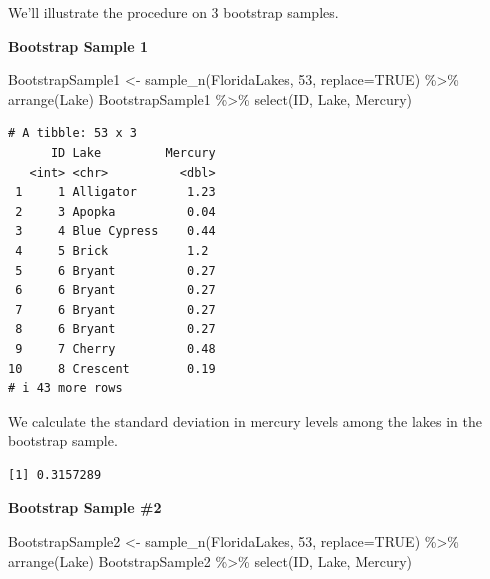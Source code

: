 \documentclass[
  letterpaper,
  DIV=11,
  numbers=noendperiod]{scrreprt}
\newenvironment{Shaded}{\begin{snugshade}}{\end{snugshade}}
\newcommand{\AttributeTok}[1]{\textcolor[rgb]{0.40,0.45,0.13}{#1}}
\newcommand{\ConstantTok}[1]{\textcolor[rgb]{0.56,0.35,0.01}{#1}}
\newcommand{\DecValTok}[1]{\textcolor[rgb]{0.68,0.00,0.00}{#1}}
\newcommand{\FunctionTok}[1]{\textcolor[rgb]{0.28,0.35,0.67}{#1}}
\newcommand{\NormalTok}[1]{\textcolor[rgb]{0.00,0.23,0.31}{#1}}
\newcommand{\OtherTok}[1]{\textcolor[rgb]{0.00,0.23,0.31}{#1}}
\newcommand{\SpecialCharTok}[1]{\textcolor[rgb]{0.37,0.37,0.37}{#1}}
\begin{document}
We'll illustrate the procedure on 3 bootstrap samples.

\textbf{Bootstrap Sample 1}

\begin{Shaded}
\begin{Highlighting}[]
\NormalTok{BootstrapSample1 }\OtherTok{\textless{}{-}} \FunctionTok{sample\_n}\NormalTok{(FloridaLakes, }\DecValTok{53}\NormalTok{, }\AttributeTok{replace=}\ConstantTok{TRUE}\NormalTok{) }\SpecialCharTok{\%\textgreater{}\%} \FunctionTok{arrange}\NormalTok{(Lake)}
\NormalTok{BootstrapSample1 }\SpecialCharTok{\%\textgreater{}\%} \FunctionTok{select}\NormalTok{(ID, Lake, Mercury)}
\end{Highlighting}
\end{Shaded}

\begin{verbatim}
# A tibble: 53 x 3
      ID Lake         Mercury
   <int> <chr>          <dbl>
 1     1 Alligator       1.23
 2     3 Apopka          0.04
 3     4 Blue Cypress    0.44
 4     5 Brick           1.2 
 5     6 Bryant          0.27
 6     6 Bryant          0.27
 7     6 Bryant          0.27
 8     6 Bryant          0.27
 9     7 Cherry          0.48
10     8 Crescent        0.19
# i 43 more rows
\end{verbatim}

We calculate the standard deviation in mercury levels among the lakes in
the bootstrap sample.

\begin{Shaded}
\end{Shaded}

\begin{verbatim}
[1] 0.3157289
\end{verbatim}

\textbf{Bootstrap Sample \#2}

\begin{Shaded}
\begin{Highlighting}[]
\NormalTok{BootstrapSample2 }\OtherTok{\textless{}{-}} \FunctionTok{sample\_n}\NormalTok{(FloridaLakes, }\DecValTok{53}\NormalTok{, }\AttributeTok{replace=}\ConstantTok{TRUE}\NormalTok{) }\SpecialCharTok{\%\textgreater{}\%} \FunctionTok{arrange}\NormalTok{(Lake)}
\NormalTok{BootstrapSample2 }\SpecialCharTok{\%\textgreater{}\%} \FunctionTok{select}\NormalTok{(ID, Lake, Mercury)}
\end{Highlighting}
\end{Shaded}
\end{document}
